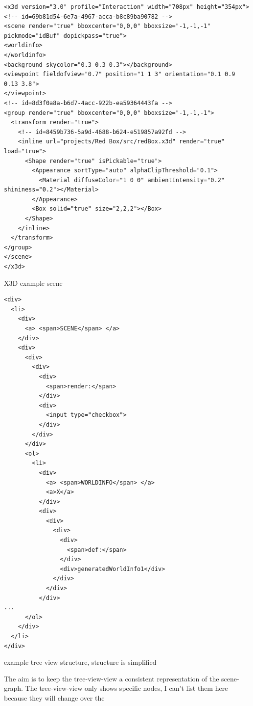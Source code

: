 \begin{listing}[H]
  \begin{verbatim}
<x3d version="3.0" profile="Interaction" width="708px" height="354px">
<!-- id=69b81d54-6e7a-4967-acca-b8c89ba90782 -->
<scene render="true" bboxcenter="0,0,0" bboxsize="-1,-1,-1" pickmode="idBuf" dopickpass="true">
<worldinfo>
</worldinfo>
<background skycolor="0.3 0.3 0.3"></background>
<viewpoint fieldofview="0.7" position="1 1 3" orientation="0.1 0.9 0.13 3.8">
</viewpoint>
<!-- id=8d3f0a8a-b6d7-4acc-922b-ea59364443fa -->
<group render="true" bboxcenter="0,0,0" bboxsize="-1,-1,-1">
  <transform render="true">
    <!-- id=8459b736-5a9d-4688-b624-e519857a92fd -->
    <inline url="projects/Red Box/src/redBox.x3d" render="true" load="true">
      <Shape render="true" isPickable="true">
        <Appearance sortType="auto" alphaClipThreshold="0.1">
          <Material diffuseColor="1 0 0" ambientIntensity="0.2" shininess="0.2"></Material>
        </Appearance>
        <Box solid="true" size="2,2,2"></Box>
      </Shape>
    </inline>
  </transform>
</group>
</scene>
</x3d>
  \end{verbatim}
	\caption{X3D example scene}
	\label{list:x3dscene}
\end{listing}

\begin{listing}[H]
  \begin{verbatim}
<div>
  <li>
    <div>
      <a> <span>SCENE</span> </a>
    </div>
    <div>
      <div>
        <div>
          <div>
            <span>render:</span>
          </div>
          <div>
            <input type="checkbox">
          </div>
        </div>
      </div>
      <ol>
        <li>
          <div>
            <a> <span>WORLDINFO</span> </a>
            <a>X</a>
          </div>
          <div>
            <div>
              <div>
                <div>
                  <span>def:</span>
                </div>
                <div>generatedWorldInfo1</div>
              </div>
            </div>
          </div>
...
      </ol>
    </div>
  </li>
</div>
  \end{verbatim}
  \caption{example tree view structure, structure is simplified}
  \label{list:tree-view}
\end{listing}

The aim is to keep the tree-view-view a consistent representation of the
scene-graph. The tree-view-view only shows specific nodes, I can't list
them here because they will change over the

